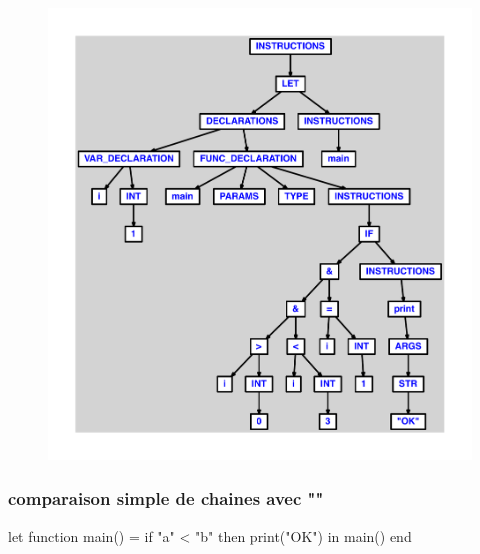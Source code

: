 \documentclass{article}
\begin{document}
\begin{figure}[H]\centering\includegraphics[max width=\textwidth]{ast/ast_174.pdf}\end{figure}\subsubsection{comparaison simple de chaines avec ""}
\begin{verbatimtab}
let
	function main() =
		if "a" < "b" then print("OK")
in main() end
\end{verbatimtab}
\end{document}

